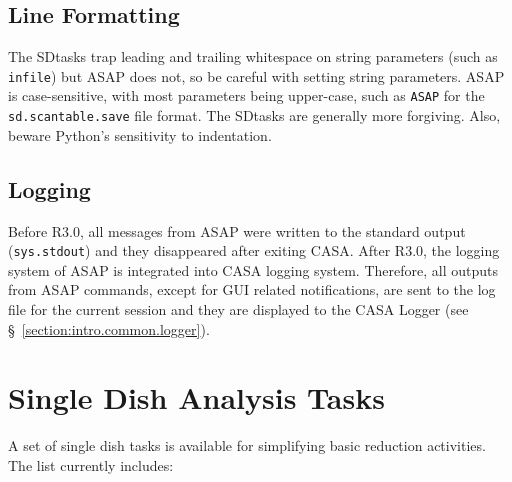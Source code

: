 \subsection{Line Formatting}
\label{section:sd.intro.line}

The SDtasks trap leading and trailing whitespace on string parameters
(such as {\tt infile}) but ASAP does not, so be
careful with setting string parameters.  ASAP is case-sensitive,
with most parameters being upper-case, such as {\tt ASAP} for the
{\tt sd.scantable.save} file format.  The SDtasks are generally
more forgiving.  Also, beware Python's sensitivity to indentation.

\subsection{Logging}
\label{section:sd.intro.log}

Before R3.0, all messages from ASAP were written to the standard output
({\tt sys.stdout}) and they disappeared after exiting CASA. After R3.0, the
logging system of ASAP is integrated into CASA logging system.  Therefore, 
all outputs from ASAP commands, except for GUI related notifications, 
are sent to the log file for the current session and they
are displayed to the CASA Logger (see \S~\ref{section:intro.common.logger}). 

\section{Single Dish Analysis Tasks}
\label{section:sd.sdtasks}

A set of single dish tasks is available for simplifying basic
reduction activities.  The list currently includes:


